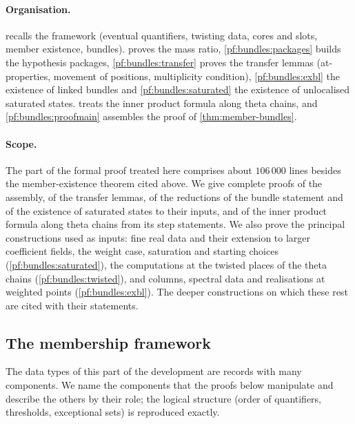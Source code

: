\paragraph{Organisation.}
 recalls the framework (eventual quantifiers, twisting data, cores and slots, member
existence, bundles).  proves the mass ratio, \cref{pf:bundles:packages} builds the hypothesis
packages, \cref{pf:bundles:transfer} proves the transfer lemmas (at-properties, movement of positions, multiplicity
condition), \cref{pf:bundles:exbl} the existence of linked bundles and \cref{pf:bundles:saturated} the existence of
unlocalised saturated states.  treats the inner product formula along theta chains, and
\cref{pf:bundles:proofmain} assembles the proof of \cref{thm:member-bundles}.

\paragraph{Scope.}
The part of the formal proof treated here comprises about $106\,000$ lines besides the member-existence theorem cited above.
We give complete proofs of the assembly, of the transfer lemmas, of the reductions of the bundle statement and
of the existence of saturated states to their inputs, and of the inner product formula along theta chains from its step
statements. We also prove the principal constructions used as inputs: fine real data and their extension to larger
coefficient fields, the weight case, saturation and starting choices (\cref{pf:bundles:saturated}), the computations at the
twisted places of the theta chains (\cref{pf:bundles:twisted}), and columns, spectral data and realisations at weighted points
(\cref{pf:bundles:exbl}). The deeper constructions on which these rest are cited with their statements.

\subsection{The membership framework}\label{pf:bundles:framework}

The data types of this part of the development are records with many components. We name the components that the proofs
below manipulate and describe the others by their role; the logical structure (order of quantifiers, thresholds,
exceptional sets) is reproduced exactly.

